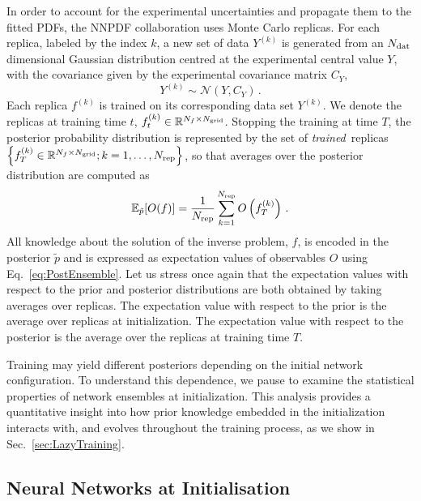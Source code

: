 In order to account for the experimental uncertainties and propagate them to the
fitted PDFs, the NNPDF collaboration uses Monte Carlo replicas. For each
replica, labeled by the index $k$, a new set of data $Y^{(k)}$ is generated from an $N_{\mathrm{dat}}$ dimensional
Gaussian distribution centred at the experimental central value $Y$, with the
covariance given by the experimental covariance matrix $C_Y$,
\begin{equation}
    \label{eq:ExpReplicaDistr}
    Y^{(k)} \sim \mathcal{N}\left(Y, C_Y\right)\, .
\end{equation}
Each replica $f^{(k)}$ is trained on its corresponding data set $Y^{(k)}$. We
denote the replicas at training time $t$, $f^{(k)}_{t} \in
\mathbb{R}^{N_{f}\times N_{\mathrm{grid}}}$. Stopping the training at time $T$, the
posterior probability distribution is represented by the set of 
{\em trained}\ replicas
$\left\{f^{(k)}_{T}\in \mathbb{R}^{N_{f}\times N_{\mathrm{grid}}}; k=1, \ldots,
N_{\rm rep}\right\}$, so that averages over the posterior distribution are computed
as
\begin{equation}
    \label{eq:PostEnsemble}
    \mathbb{E}_{\tilde{p}}[O(f)] = \frac{1}{N_{\rm rep}} \sum_{k=1}^{N_{\rm rep}}
        O\left(f^{(k)}_{T}\right)\, .
\end{equation}
All knowledge about the solution of the inverse problem, $f$, is encoded in the
posterior $\tilde{p}$ and is expressed as expectation values of observables $O$
using Eq.~\eqref{eq:PostEnsemble}. Let us stress once again that the expectation values
with respect to the prior and posterior distributions are both obtained by taking 
averages over replicas. The expectation value with respect to the prior is the average over
replicas at initialization. The expectation value with respect to the posterior is the average
over the replicas at training time $T$. 

Training may yield different posteriors depending on the initial network
configuration. To understand this dependence, we pause to examine the
statistical properties of network ensembles at initialization. This analysis
provides a quantitative insight into how prior knowledge embedded in the initialization
interacts with, and evolves throughout the training process, as we show in
Sec.~\ref{sec:LazyTraining}.

\subsection{Neural Networks at Initialisation}
\label{sec:NNinit}


